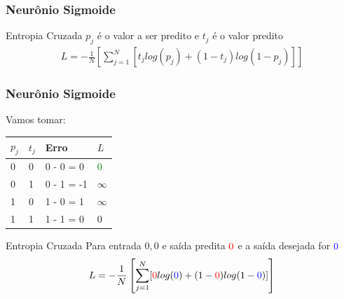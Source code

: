 \documentclass{beamer}
\begin{document}
\begin{frame}
	\frametitle{Neurônio Sigmoide}
	\begin{block}{Entropia Cruzada}
		$p_j$ é o valor a ser predito e $t_j$ é o valor predito
		\begin{gather*}
			L = - \frac{1}{N} \left [ \sum_{j=1}^{N} [t_j log(p_j) + (1-t_j)log(1-p_j)] \right ] 
		\end{gather*}
	\end{block}
\end{frame}

\begin{frame}
	\frametitle{Neurônio Sigmoide}
	Vamos tomar:
	\begin{table}[]
		\begin{tabular}{|l|l|l|l|}
			\hline
			$p_j$ & $t_j$ & Erro  & $L$ \\ \hline
			0  & 0  & 0 - 0 = 0  & \textcolor{green}{0}  \\ \hline
			0  & 1  & 0 - 1 = -1 & $\infty$ \\ \hline
			1  & 0  & 1 - 0 = 1  & $\infty$ \\ \hline
			1  & 1  & 1 - 1 = 0  & 0 \\ \hline
		\end{tabular}
	\end{table}
	\begin{block}{Entropia Cruzada}
		Para entrada $0, 0$ e saída predita $\textcolor{red}{0}$ e a saída desejada for $\textcolor{blue}{0}$
		\begin{gather*}
			L = - \frac{1}{N} \left [ \sum_{j=1}^{N} [\textcolor{red}{0} log(\textcolor{blue}{0} ) + (1-\textcolor{red}{0})log(1-\textcolor{blue}{0} )] \right ] 
		\end{gather*}
	\end{block}
\end{frame}
\end{document}
